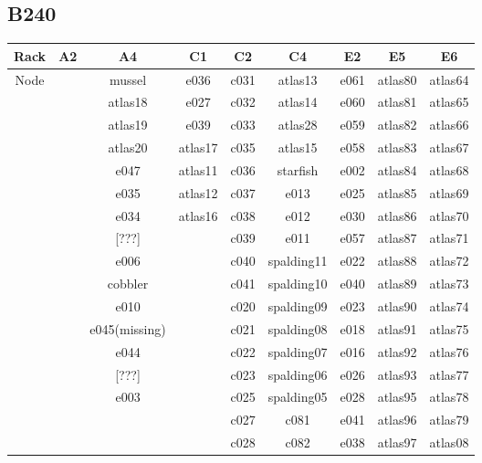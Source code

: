 \documentclass[10pt,letterpaper]{article}
\begin{document}
    \subsection{B240}
        \begin{center}
        \begin{tabular}{ |c|c|c|c|c|c|c|c|c| }
        \hline
        Rack & A2 & A4 & C1 & C2 & C4 & E2 & E5 & E6 \\
        \hline
        \multirow{1}{3em}{Node}

        &      & mussel  & e036    & c031 & atlas13    & e061 & atlas80 & atlas64 \\
        &      & atlas18 & e027    & c032 & atlas14    & e060 & atlas81 & atlas65 \\
        &      & atlas19 & e039    & c033 & atlas28    & e059 & atlas82 & atlas66 \\
        &      & atlas20 & atlas17 & c035 & atlas15    & e058 & atlas83 & atlas67 \\
        &      & e047    & atlas11 & c036 & starfish   & e002 & atlas84 & atlas68 \\
        &      & e035    & atlas12 & c037 & e013       & e025 & atlas85 & atlas69 \\
        &      & e034    & atlas16 & c038 & e012       & e030 & atlas86 & atlas70 \\
        &      & [???]   &         & c039 & e011       & e057 & atlas87 & atlas71 \\
        &      & e006    &         & c040 & spalding11 & e022 & atlas88 & atlas72 \\
        &      & cobbler &         & c041 & spalding10 & e040 & atlas89 & atlas73 \\
        &      & e010    &         & c020 & spalding09 & e023 & atlas90 & atlas74 \\
        &      & e045(missing)   &         & c021 & spalding08 & e018 & atlas91 & atlas75 \\
        &      & e044    &         & c022 & spalding07 & e016 & atlas92 & atlas76 \\
        &      & [???]   &         & c023 & spalding06 & e026 & atlas93 & atlas77 \\
        &      & e003    &         & c025 & spalding05 & e028 & atlas95 & atlas78 \\
        &      &         &         & c027 & c081       & e041 & atlas96 & atlas79 \\
        &      &         &         & c028 & c082       & e038 & atlas97 & atlas08 \\

\end{tabular}
\end{center}
\end{document}
